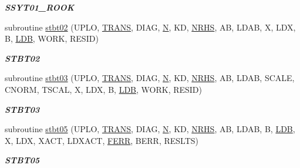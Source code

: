 \begin{DoxyCompactItemize}
\begin{DoxyCompactList}\small\item\em {\bfseries S\+S\+Y\+T01\+\_\+\+R\+O\+O\+K} \end{DoxyCompactList}\item 
subroutine \hyperlink{group__single__lin_ga822e53a92439faf03b27b7c6bbe0c183}{stbt02} (U\+P\+L\+O, \hyperlink{superlu__enum__consts_8h_a0c4e17b2d5cea33f9991ccc6a6678d62a1f61e3015bfe0f0c2c3fda4c5a0cdf58}{T\+R\+A\+N\+S}, D\+I\+A\+G, \hyperlink{polmisc_8c_a0240ac851181b84ac374872dc5434ee4}{N}, K\+D, \hyperlink{example__user_8c_aa0138da002ce2a90360df2f521eb3198}{N\+R\+H\+S}, A\+B, L\+D\+A\+B, X, L\+D\+X, B, \hyperlink{example__user_8c_a50e90a7104df172b5a89a06c47fcca04}{L\+D\+B}, W\+O\+R\+K, R\+E\+S\+I\+D)
\begin{DoxyCompactList}\small\item\em {\bfseries S\+T\+B\+T02} \end{DoxyCompactList}\item 
subroutine \hyperlink{group__single__lin_gab9e5280f038cf4a494ebedde22146ae9}{stbt03} (U\+P\+L\+O, \hyperlink{superlu__enum__consts_8h_a0c4e17b2d5cea33f9991ccc6a6678d62a1f61e3015bfe0f0c2c3fda4c5a0cdf58}{T\+R\+A\+N\+S}, D\+I\+A\+G, \hyperlink{polmisc_8c_a0240ac851181b84ac374872dc5434ee4}{N}, K\+D, \hyperlink{example__user_8c_aa0138da002ce2a90360df2f521eb3198}{N\+R\+H\+S}, A\+B, L\+D\+A\+B, S\+C\+A\+L\+E, C\+N\+O\+R\+M, T\+S\+C\+A\+L, X, L\+D\+X, B, \hyperlink{example__user_8c_a50e90a7104df172b5a89a06c47fcca04}{L\+D\+B}, W\+O\+R\+K, R\+E\+S\+I\+D)
\begin{DoxyCompactList}\small\item\em {\bfseries S\+T\+B\+T03} \end{DoxyCompactList}\item 
subroutine \hyperlink{group__single__lin_gac5096f156bbbea0815542db459f8a9f6}{stbt05} (U\+P\+L\+O, \hyperlink{superlu__enum__consts_8h_a0c4e17b2d5cea33f9991ccc6a6678d62a1f61e3015bfe0f0c2c3fda4c5a0cdf58}{T\+R\+A\+N\+S}, D\+I\+A\+G, \hyperlink{polmisc_8c_a0240ac851181b84ac374872dc5434ee4}{N}, K\+D, \hyperlink{example__user_8c_aa0138da002ce2a90360df2f521eb3198}{N\+R\+H\+S}, A\+B, L\+D\+A\+B, B, \hyperlink{example__user_8c_a50e90a7104df172b5a89a06c47fcca04}{L\+D\+B}, X, L\+D\+X, X\+A\+C\+T, L\+D\+X\+A\+C\+T, \hyperlink{superlu__enum__consts_8h_af00a42ecad444bbda75cde1b64bd7e72a78fd14d7abebae04095cfbe02928f153}{F\+E\+R\+R}, B\+E\+R\+R, R\+E\+S\+L\+T\+S)
\begin{DoxyCompactList}\small\item\em {\bfseries S\+T\+B\+T05} \end{DoxyCompactList}\item 

\end{DoxyCompactItemize}
